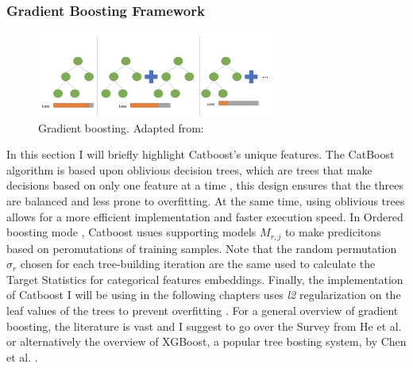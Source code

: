 \subsubsection{Gradient Boosting Framework}

\begin{figure}[H]
    \centering
    \includegraphics[width=0.7\textwidth]{figures/gradient_boosting_v2.png}
    \caption{Gradient boosting. Adapted from: \cite{Yenigun2022}}
    \label{fig:catboost}
\end{figure}

In this section I will briefly highlight Catboost's unique features. The CatBoost algorithm is based upon oblivious decision trees, which are trees that make decisions based on only one feature at a time \cite{dorogush2018catboost}, this design ensures that the threes are balanced and less prone to overfitting. At the same time, using oblivious trees allows for a more efficient implementation and faster execution speed. In Ordered boosting mode \cite{dorogush2018catboost}, Catboost usues supporting models $M_{r,j}$ to make predicitons based on peromutations of training samples. Note that the random permutation $\sigma_r$ chosen for each tree-building iteration are the same used to calculate the Target Statistics for categorical features embeddings. Finally, the implementation of Catboost I will be using in the following chapters uses \textit{l2} regularization on the leaf values of the trees to prevent overfitting \cite{dorogush2018catboost,prokhorenkova2018catboost}. For a general overview of gradient boosting, the literature is vast and I suggest to go over the Survey from He et al. \cite{he2019gradient} or alternatively the overview of XGBoost, a popular tree bosting system, by Chen et al. \cite{Chen_2016}. 







